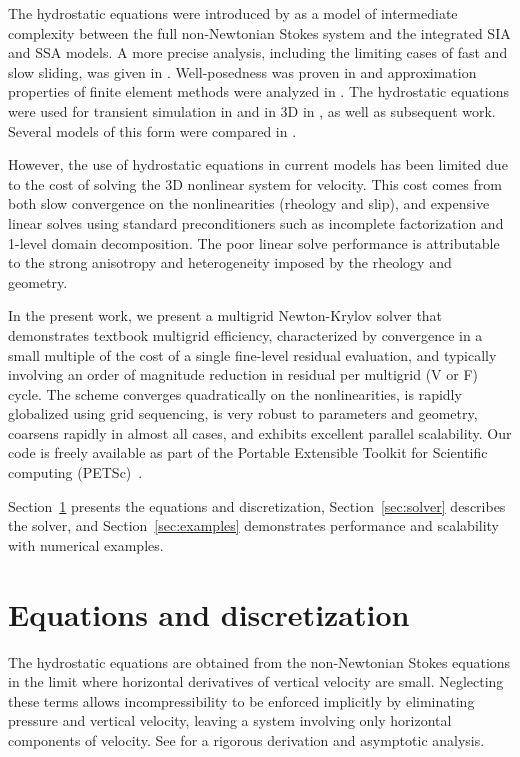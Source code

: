\documentclass[3p]{elsarticle}
\begin{document}
The hydrostatic equations were introduced by \cite{blatter1995vas} as a model of intermediate complexity between the full non-Newtonian Stokes system and the integrated SIA and SSA models.  A more precise analysis, including the limiting cases of fast and slow sliding, was given in \cite{schoof2010thin}.  Well-posedness was proven in \cite{colinge1999strongly} and approximation properties of finite element methods were analyzed in \cite{glowinski2003approximation,chow2004finite}.  The hydrostatic equations were used for transient simulation in \cite{pattyn2002tgr} and in 3D in \cite{pattyn2003ntd}, as well as subsequent work. Several models of this form were compared in \cite{pattyn2008beh}.

However, the use of hydrostatic equations in current models has been limited due to the cost of solving the 3D nonlinear system for velocity.  This cost comes from both slow convergence on the
nonlinearities (rheology and slip), and expensive linear solves using standard preconditioners such
as incomplete factorization and 1-level domain decomposition.  The poor linear solve performance is
attributable to the strong anisotropy and heterogeneity imposed by the rheology and geometry.

In the present work, we present a multigrid Newton-Krylov solver that demonstrates textbook
multigrid efficiency, characterized by convergence in a small multiple of the cost of a single
fine-level residual evaluation, and typically involving an order of magnitude reduction in residual
per multigrid (V or F) cycle.  The scheme converges quadratically on the nonlinearities, is rapidly
globalized using grid sequencing, is very robust to parameters and geometry, coarsens rapidly in
almost all cases, and exhibits excellent parallel scalability.  Our code is freely available as part
of the Portable Extensible Toolkit for Scientific computing (PETSc)~\cite{petsc-web-page}.

Section~\ref{sec:equations} presents the equations and discretization, Section~\ref{sec:solver} describes the solver, and Section~\ref{sec:examples} demonstrates performance and scalability with numerical examples.

\section{Equations and discretization}\label{sec:equations}
The hydrostatic equations are obtained from the non-Newtonian Stokes equations in the limit where
horizontal derivatives of vertical velocity are small.  Neglecting these terms allows
incompressibility to be enforced implicitly by eliminating pressure and vertical velocity, leaving a
system involving only horizontal components of velocity.  See \cite{schoof2010thin} for a rigorous
derivation and asymptotic analysis.
\end{document}
